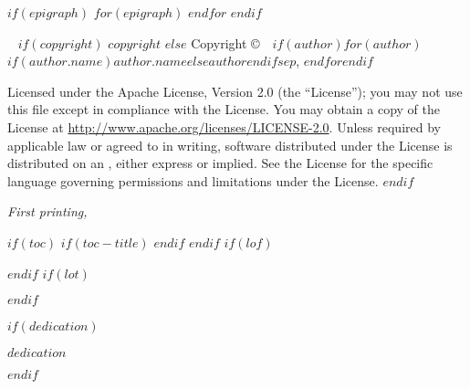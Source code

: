 \frontmatter

\blankpage

$if(epigraph)$
\newpage\thispagestyle{empty}
$for(epigraph)$
\vfill
$endfor$
$endif$

\maketitle

\newpage
\begin{fullwidth}
~\vfill
\thispagestyle{empty}
\setlength{\parindent}{0pt}
\setlength{\parskip}{\baselineskip}
$if(copyright)$
$copyright$
$else$
Copyright \copyright\ \the\year\ $if(author)$$for(author)$$if(author.name)$$author.name$$else$$author$$endif$$sep$, $endfor$$endif$

\par{}

\par{}

\par Licensed under the Apache License, Version 2.0 (the ``License''); you may not
use this file except in compliance with the License. You may obtain a copy
of the License at \url{http://www.apache.org/licenses/LICENSE-2.0}. Unless
required by applicable law or agreed to in writing, software distributed
under the License is distributed on an , either express or implied. See the
License for the specific language governing permissions and limitations
under the License.
$endif$

\par\textit{First printing, \monthyear}
\end{fullwidth}

$if(toc)$
{
$if(toc-title)$
\renewcommand*\contentsname{$toc-title$}
$endif$
\tableofcontents
}
$endif$
$if(lof)$
\listoffigures
$endif$
$if(lot)$
\listoftables
$endif$

$if(dedication)$
\cleardoublepage
~\vfill
\begin{doublespace}
\noindent\fontsize{18}{22}\selectfont\itshape
\nohyphenation
$dedication$
\end{doublespace}
\vfill
\vfill
$endif$

\mainmatter